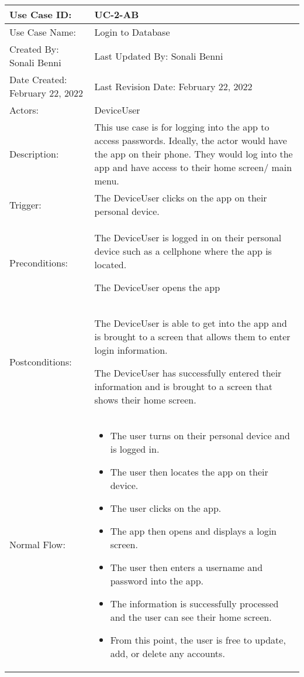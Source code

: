 \documentclass[stu]{apa7}
\newcommand{\nextitem}{\par\hspace*{\labelsep}\textbullet\hspace*{\labelsep}}
\begin{document}
\scriptsize{\begin{xltabular}{\textwidth}{|l|X|}
  \hline Use Case ID: & UC-2-AB \\ \hline

  Use Case Name: & Login to Database \\ \hline

  Created By: Sonali Benni & Last Updated By: Sonali Benni \\ \hline

  Date Created: February 22, 2022 & Last Revision Date: February 22, 2022 \\ \hline

  Actors: & \nextitem DeviceUser \\ \hline
  
  Description: & This use case is for logging into the app to access passwords. Ideally, the actor would have the app on their phone. They would log into the app and have access to their home screen/ main menu. \\ \hline

  Trigger: & The DeviceUser clicks on the app on their personal device. \\ \hline

  Preconditions: & \nextitem The DeviceUser is logged in on their personal device such as a cellphone where the app is located. \nextitem The DeviceUser opens the app \\ \hline

  Postconditions: & \nextitem The DeviceUser is able to get into the app and is brought to a screen that allows them to enter login information.
    \nextitem The DeviceUser has successfully entered their information and is brought to a screen that shows their home screen.  \\ \hline

  Normal Flow: & 
    \begin{itemize}
      \item The user turns on their personal device and is logged in. 
      \item The user then locates the app on their device. 
      \item The user clicks on the app.
      \item The app then opens and displays a login screen.
      \item The user then enters a username and password into the app.
      \item The information is successfully processed and the user can see their home screen.
      \item From this point, the user is free to update, add, or delete any accounts.
    \end{itemize} \\ \hline


\end{xltabular}}
\end{document}
